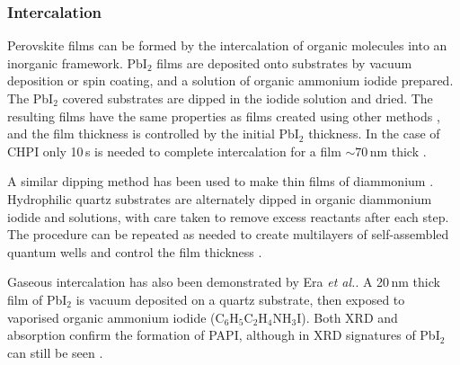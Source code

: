 \subsubsection{Intercalation}
Perovskite films can be formed by the intercalation of organic molecules into an inorganic framework. Pb$\textrm{I}_2$ films are deposited onto substrates by vacuum deposition or spin coating, and a solution of organic ammonium iodide prepared. The Pb$\textrm{I}_2$ covered substrates are dipped in the iodide solution and dried. The resulting films have the same properties as films created using other methods \cite{Liang1998}, and the film thickness is controlled by the initial Pb$\textrm{I}_2$ thickness. In the case of CHPI only 10\,s is needed to complete intercalation for a film $\sim70$\,nm thick \cite{Pradeesh2009a}.

A similar dipping method has been used to make thin films of diammonium . Hydrophilic quartz substrates are alternately dipped in organic diammonium iodide and  solutions, with care taken to remove excess reactants after each step. The procedure can be repeated as needed to create multilayers of self-assembled quantum wells and control the film thickness \cite{Matsui2002}.

Gaseous intercalation has also been demonstrated by Era \textit{et al.}. A 20\,nm thick film of Pb$\textrm{I}_2$ is vacuum deposited on a quartz substrate, then exposed to vaporised organic ammonium iodide ($\textrm{C}_6\textrm{H}_5\textrm{C}_2\textrm{H}_4\textrm{NH}_3\textrm{I}$). Both XRD and absorption confirm the formation of PAPI, although in XRD signatures of Pb$\textrm{I}_2$ can still be seen \cite{Era1998}.


